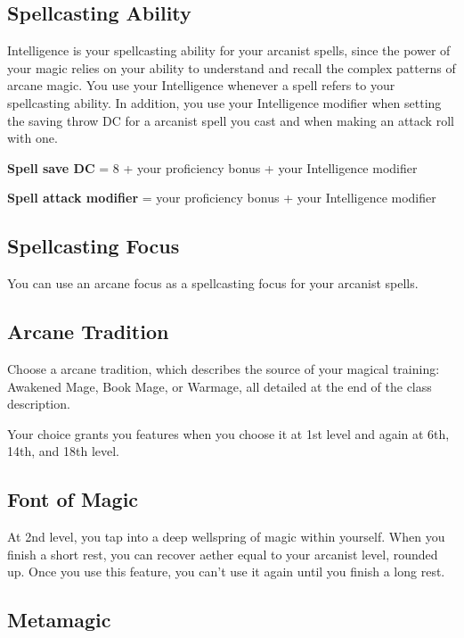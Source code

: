 \subsection{Spellcasting Ability}

Intelligence is your spellcasting ability for your arcanist spells, since the power of your magic relies on your ability to understand and recall the complex patterns of arcane magic. You use your Intelligence whenever a spell refers to your spellcasting ability. In addition, you use your Intelligence modifier when setting the saving throw DC for a arcanist spell you cast and when making an attack roll with one.

\textbf{Spell save DC} = 8 + your proficiency bonus + your Intelligence modifier

\textbf{Spell attack modifier} = your proficiency bonus + your Intelligence modifier

\subsection{Spellcasting Focus}

You can use an arcane focus as a spellcasting focus for your arcanist spells.

\subsection{Arcane Tradition}

Choose a arcane tradition, which describes the source of your magical training: Awakened Mage, Book Mage, or Warmage, all detailed at the end of the class description.

Your choice grants you features when you choose it at 1st level and again at 6th, 14th, and 18th level.

\subsection{Font of Magic}

At 2nd level, you tap into a deep wellspring of magic within yourself. When you finish a short rest, you can recover aether equal to your arcanist level, rounded up. Once you use this feature, you can't use it again until you finish a long rest.

\subsection{Metamagic}

